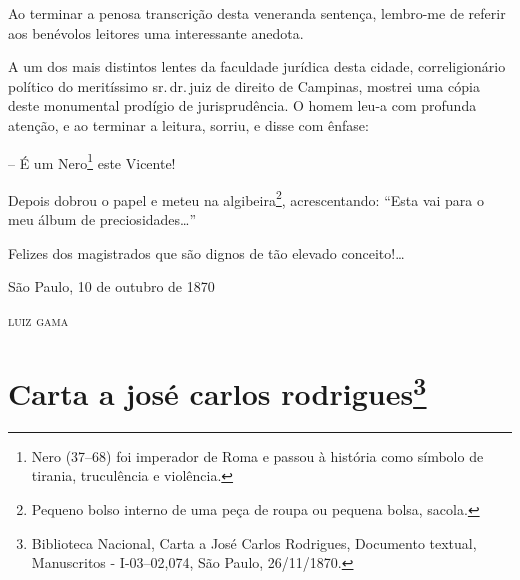 Ao terminar a penosa transcrição desta veneranda sentença, lembro-me de
referir aos benévolos leitores uma interessante anedota.

A um dos mais distintos lentes da faculdade jurídica desta cidade,
correligionário político do meritíssimo sr.\,dr.\,juiz de direito de
Campinas, mostrei uma cópia deste monumental prodígio de jurisprudência.
O homem leu-a com profunda atenção, e ao terminar a leitura, sorriu, e
disse com ênfase:

-- É um Nero\footnote{ Nero (37--68) foi imperador de Roma e passou à
  história como símbolo de tirania, truculência e violência.} este
Vicente!

Depois dobrou o papel e meteu na algibeira\footnote{ Pequeno bolso
  interno de uma peça de roupa ou pequena bolsa, sacola.},
acrescentando: ``Esta vai para o meu álbum de preciosidades\ldots{}''

Felizes dos magistrados que são dignos de tão elevado conceito!\ldots{}

\begin{flushright}
São Paulo, 10 de outubro de 1870

\textsc{luiz gama}
\end{flushright}

\chapter{Carta a josé carlos rodrigues\footnote{Biblioteca Nacional, Carta a José Carlos Rodrigues,
  Documento textual, Manuscritos - I-03--02,074, São Paulo, 26/11/1870.}} %

